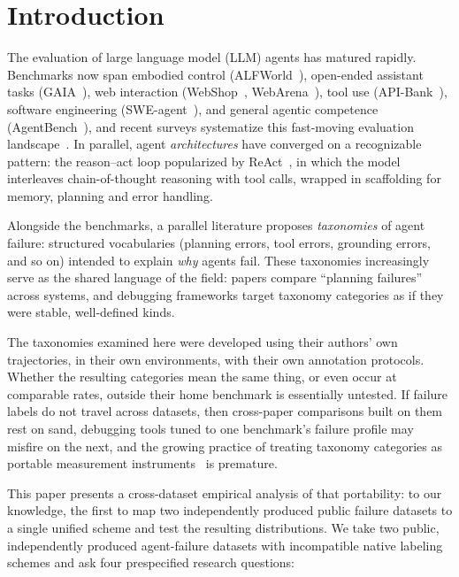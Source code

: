 \documentclass[12pt,letterpaper]{article}
\begin{document}
\section{Introduction}
The evaluation of large language model (LLM) agents has matured rapidly. Benchmarks now
span embodied control (ALFWorld~\cite{shridhar2021alfworld}), open-ended
assistant tasks (GAIA~\cite{mialon2024gaia}), web interaction
(WebShop~\cite{yao2022webshop}, WebArena~\cite{zhou2024webarena}), tool use
(API-Bank~\cite{li2023apibank}), software engineering
(SWE-agent~\cite{yang2024sweagent}), and general agentic competence
(AgentBench~\cite{liu2023agentbench}), and recent surveys systematize this
fast-moving evaluation landscape~\cite{yehudai2025survey}. In parallel, agent
\emph{architectures} have converged on a recognizable pattern: the
reason--act loop popularized by ReAct~\cite{yao2023react}, in which the model
interleaves chain-of-thought reasoning with tool calls, wrapped in scaffolding
for memory, planning and error handling.

Alongside the benchmarks, a parallel literature proposes \emph{taxonomies} of
agent failure: structured vocabularies (planning errors, tool errors,
grounding errors, and so on) intended to explain \emph{why} agents fail. These
taxonomies increasingly serve as the shared language of the field: papers
compare ``planning failures'' across systems, and debugging frameworks target
taxonomy categories as if they were stable, well-defined kinds.

The taxonomies examined here were developed using their authors' own
trajectories, in their own environments, with their own annotation protocols.
Whether the resulting categories mean the same thing, or even occur at
comparable rates, outside their home benchmark is essentially untested. If
failure labels do not travel across datasets, then cross-paper comparisons
built on them rest on sand, debugging tools tuned to one benchmark's failure
profile may misfire on the next, and the growing practice of treating
taxonomy categories as portable measurement
instruments~\cite{yehudai2025survey} is premature.

This paper presents a cross-dataset empirical analysis of that portability:
to our knowledge, the first to map two independently produced public
failure datasets to a single unified scheme and test the resulting
distributions. We take two
public, independently produced agent-failure datasets with incompatible native
labeling schemes and ask four prespecified research questions:
\end{document}
